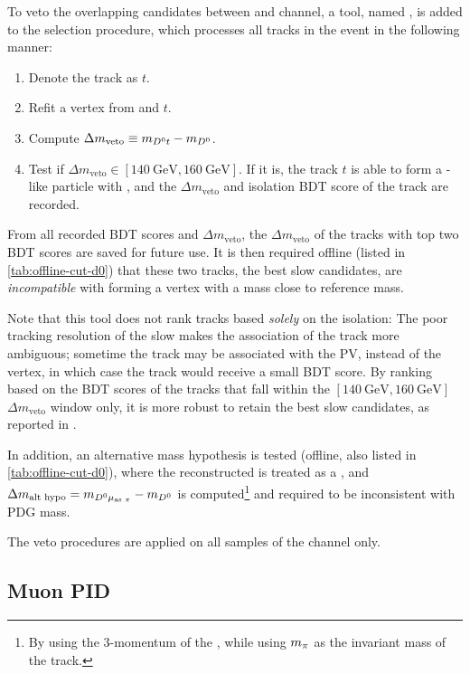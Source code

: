To veto the overlapping candidates between \Dz and \Dstar channel,
a tool, named ,
is added to the selection procedure, which processes all tracks
in the event in the following manner:

\begin{enumerate}
    \item Denote the track as $t$.
    \item Refit a vertex from \Dz and $t$.
    \item Compute $\Delta m_\text{veto} \equiv m_{{{D}^0} t} - m_{{D}^0}$.
    \item Test if $\Delta m_\text{veto} \in [140~\text{GeV}, 160~\text{GeV}]$.
        If it is, the track $t$ is able to form a \Dstar-like particle with \Dz,
        and the $\Delta m_\text{veto}$ and isolation BDT score
        of the track are recorded.
\end{enumerate}

From all recorded BDT scores and $\Delta m_\text{veto}$, the
$\Delta m_\text{veto}$ of the tracks with top two BDT scores are saved
for future use.
It is then required offline (listed in \cref{tab:offline-cut-d0})
that these two tracks,
the best slow \pion candidates,
are \emph{incompatible} with
forming a \Dz\pion vertex with a mass close to \Dstar reference mass.

Note that this tool does not rank tracks based \emph{solely} on the isolation:
The poor tracking resolution of the slow \pion makes the association of
the track more ambiguous; sometime the track may be associated with the PV,
instead of the \B vertex, in which case the track would receive a small BDT
score.
By ranking based on the BDT scores of the tracks that fall within the
$[140~\text{GeV}, 160~\text{GeV}]$
$\Delta m_\text{veto}$ window only,
it is more robust to retain the best slow \pion candidates,
as reported in \cite{LHCb-ANA-2020-056}.

In addition, an alternative mass hypothesis is tested
(offline, also listed in \cref{tab:offline-cut-d0}), where the reconstructed
\muon is treated as a \pion,
and $\Delta m_\text{alt hypo} = m_{{{D}^0}{\mu}_\text{as {\ensuremath{\pi}}}} - m_{{D}^0}$
is computed\footnote{
    By using the 3-momentum of the \muon, while using $m_{\pi}$ as the invariant
    mass of the track.
} and required to be inconsistent with \Dstar PDG mass.

The veto procedures are applied on all samples of the \Dz channel only.


\subsection{Muon PID}
\label{ref:sel:tech:ubdt}

